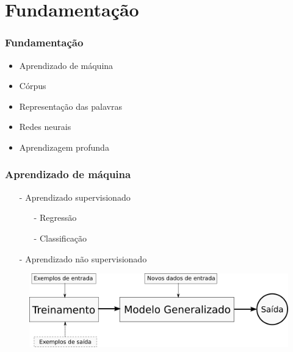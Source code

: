 \documentclass[10pt]{beamer}
\begin{document}
\section{Fundamentação}

\begin{frame}[fragile]
  \frametitle{Fundamentação}

  \begin{itemize}
    \item Aprendizado de máquina
    \item Córpus
    \item Representação das palavras
    \item Redes neurais
    \item Aprendizagem profunda
  \end{itemize}
  

\end{frame}


\begin{frame}[fragile]
  \frametitle{Aprendizado de máquina}

  \begin{itemize}
    \item[-] Aprendizado supervisionado
    \begin{itemize}
      \item[-] Regressão
      \item[-] Classificação  
    \end{itemize}
    \item[-] Aprendizado não supervisionado
  \end{itemize}

  \begin{figure}[htb]
  \begin{center}
      \includegraphics[scale=0.38]{img/passoapasso.png}
  \end{center}
\end{figure}

\end{frame}
\end{document}
